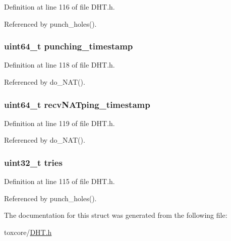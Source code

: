 Definition at line 116 of file D\+H\+T.\+h.



Referenced by punch\+\_\+holes().

\hypertarget{struct_n_a_t_ab8cadc230283568e7aeb303691d8e374}{
\subsubsection[{punching\+\_\+timestamp}]{\setlength{\rightskip}{0pt plus 5cm}uint64\+\_\+t punching\+\_\+timestamp}}\label{struct_n_a_t_ab8cadc230283568e7aeb303691d8e374}


Definition at line 118 of file D\+H\+T.\+h.



Referenced by do\+\_\+\+N\+A\+T().

\hypertarget{struct_n_a_t_a237df5177fc9db865722933b5b6468ea}{
\subsubsection[{recv\+N\+A\+Tping\+\_\+timestamp}]{\setlength{\rightskip}{0pt plus 5cm}uint64\+\_\+t recv\+N\+A\+Tping\+\_\+timestamp}}\label{struct_n_a_t_a237df5177fc9db865722933b5b6468ea}


Definition at line 119 of file D\+H\+T.\+h.



Referenced by do\+\_\+\+N\+A\+T().

\hypertarget{struct_n_a_t_a852b5b4a6ac0e351887ab6dde3e3fcc5}{
\subsubsection[{tries}]{\setlength{\rightskip}{0pt plus 5cm}uint32\+\_\+t tries}}\label{struct_n_a_t_a852b5b4a6ac0e351887ab6dde3e3fcc5}


Definition at line 115 of file D\+H\+T.\+h.



Referenced by punch\+\_\+holes().



The documentation for this struct was generated from the following file\+:\begin{DoxyCompactItemize}
\item 
toxcore/\hyperlink{_d_h_t_8h}{D\+H\+T.\+h}\end{DoxyCompactItemize}
